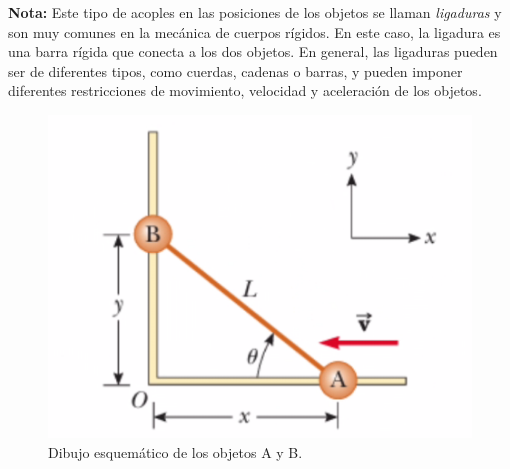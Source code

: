 \documentclass{replab}
\begin{document}
	\textbf{Nota:} Este tipo de acoples en las posiciones de los objetos se llaman \textit{ligaduras} y son muy comunes en la mecánica de cuerpos rígidos. En este caso, la ligadura es una barra rígida que conecta a los dos objetos. En general, las ligaduras pueden ser de diferentes tipos, como cuerdas, cadenas o barras, y pueden imponer diferentes restricciones de movimiento, velocidad y aceleración de los objetos.
	
	\begin{figure}[htbp]
		\centering
		\includegraphics[width=.4\columnwidth]{imagenes/ligaduras.png}
		\caption{Dibujo esquemático de los objetos A y B.}
		\label{fig:ligaduras}
	\end{figure}

	\printbibliography[heading=bibintoc]
	
\end{document}
